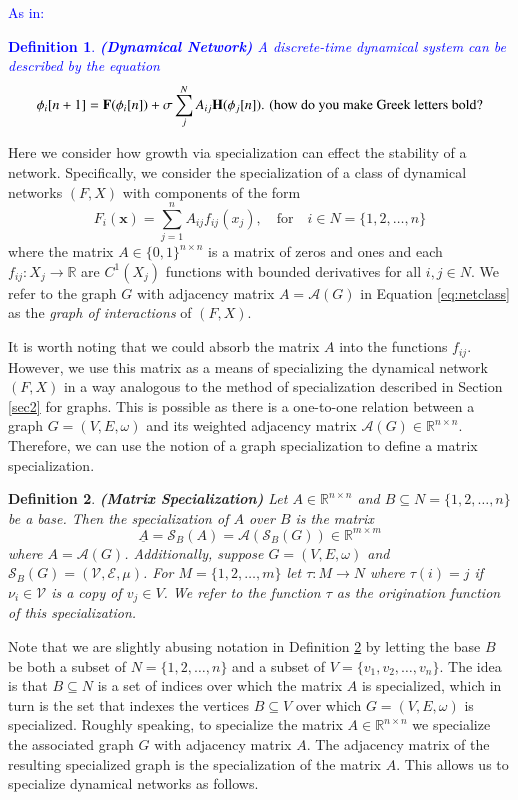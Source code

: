 \documentclass[10pt]{elsarticle}
\newtheorem{definition}{Definition}
\theoremstyle{remark}
\begin{document}
\textcolor{blue}{As in:\\
\begin{definition}\label{def:dn2}{\textbf{\emph{(Dynamical Network)}}}
A discrete-time dynamical system can be described by the equation
\[
\mathbf{\phi}_i[n+1]=\mathbf{F}(\mathbf{\phi}_i[n])+\sigma\sum_j^NA_{ij}\mathbf{H}(\mathbf{\phi}_j[n]).\,\, \text{(how do you make Greek letters bold?}
\]
\end{definition}}
Here we consider how growth via specialization can effect the stability of a network. Specifically, we consider the specialization of a class of dynamical networks $(F,X)$ with components of the form
\begin{equation}\label{eq:netclass}
F_i(\mathbf{x})=\sum_{j=1}^n A_{ij}f_{ij}(x_j), \quad \text{for} \quad i\in N=\{1,2,\dots,n\}
\end{equation}
where the matrix $A\in\{0,1\}^{n\times n}$ is a matrix of zeros and ones and each $f_{ij}:X_j\rightarrow\mathbb{R}$ are $C^1(X_j)$ functions with bounded derivatives for all $i,j\in N$. We refer to the graph $G$ with adjacency matrix $A=\mathcal{A}(G)$ in Equation \eqref{eq:netclass} as the \emph{graph of interactions} of $(F,X)$.

It is worth noting that we could absorb the matrix $A$ into the functions $f_{ij}$. However, we use this matrix as a means of specializing the dynamical network $(F,X)$ in a way analogous to the method of specialization described in Section \ref{sec2} for graphs. This is possible as there is a one-to-one relation between a graph $G=(V,E,\omega)$ and its weighted adjacency matrix $\mathcal{A}(G)\in\mathbb{R}^{n\times n}$. Therefore, we can use the notion of a graph specialization to define a matrix specialization.

\begin{definition}\label{def:matspec}\textbf{(Matrix Specialization)}
Let $A\in\mathbb{R}^{n\times n}$ and $B\subseteq N=\{1,2,\dots,n\}$ be a base. Then the \emph{specialization} of $A$ over $B$ is the matrix
\[
\underline{A}=\mathcal{S}_B(A)=\mathcal{A}(\mathcal{S}_B(G))\in\mathbb{R}^{m\times m}
\]
where $A=\mathcal{A}(G)$. Additionally, suppose $G=(V,E,\omega)$ and $\mathcal{S}_B(G)=(\mathcal{V},\mathcal{E},\mu)$. For $M=\{1,2,\dots,m\}$ let $\tau:M\rightarrow N$ where $\tau(i)=j$ if $\nu_i\in\mathcal{V}$ is a copy of $v_j\in V$. We refer to the function $\tau$ as the \emph{origination function} of this specialization.
\end{definition}

Note that we are slightly abusing notation in Definition \ref{def:matspec} by letting the base $B$ be both a subset of $N=\{1,2,\dots,n\}$ and a subset of $V=\{v_1,v_2,\dots,v_n\}$. The idea is that $B\subseteq N$ is a set of indices over which the matrix $A$ is specialized, which in turn is the set that indexes the vertices $B\subseteq V$ over which $G=(V,E,\omega)$ is specialized. Roughly speaking, to specialize the matrix $A\in\mathbb{R}^{n\times n}$ we specialize the associated graph $G$ with adjacency matrix $A$. The adjacency matrix of the resulting specialized graph is the specialization of the matrix $A$. This allows us to specialize dynamical networks as follows.
\end{document}
